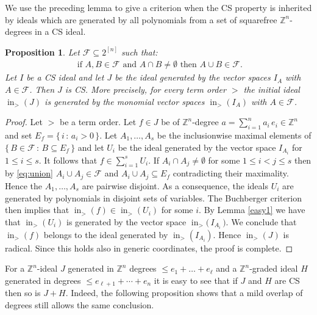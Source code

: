 \documentclass{amsart}
\newtheorem{proposition}[theorem]{Proposition}
\theoremstyle{definition}
\numberwithin{equation}{section}
\def\ini{\operatorname{in}}
\def\ZZ{\mathbb{Z}}
\begin{document}
We use the preceding lemma to give a criterion when the CS property is
inherited by ideals which are generated by all polynomials from a set of squarefree
$\ZZ^n$-degrees in a CS ideal.

\begin{proposition}
\label{easy2} Let $\mathcal{F}\subseteq 2^{[n]}$ such that:
\begin{align} \label{eq:union}
    \text{ if } A,B\in \mathcal{F}  \text{ and } A\cap B\neq \emptyset \text{ then } A\cup B\in \mathcal{F}. 
    \end{align}
    Let $I$ be a CS ideal and  let $J$ be the ideal generated by the vector spaces $I_A$ with $A\in \mathcal{F}$. Then $J$ is CS. More precisely, for every term order $>$ the initial ideal  
$\ini_{>}(J)$ is generated  by the monomial vector spaces $\ini_{>}(I_A)$ with $A\in \mathcal{F}$. 
\end{proposition}

\begin{proof} Let $>$ be a term order. Let $f\in J$ be of 
$\ZZ^n$-degree
$a = \sum_{i=1}^ n a_i\, e_i\in \ZZ^n$ and set $E_f=\{\, i\, :\, a_i>0\,\}$. Let $A_1,\dots,A_s$ be the inclusionwise maximal elements of $\{ \,B \in \mathcal F\,:\,B \subseteq E_f\,\}$ and let $U_i$ be the ideal generated by the vector space $I_{A_i}$ for $1 \leq i \leq s$. 
 It follows that $f\in \sum_{i=1}^s U_i$. If $A_i \cap A_j \neq \emptyset$ for some $1 \leq i < j \leq s$ then by \eqref{eq:union} $A_i \cup A_j \in \mathcal F$
 and $A_i \cup A_j \subseteq E_f$ contradicting their maximality. 
 Hence the $A_1,\ldots, A_s$ are pairwise disjoint. 
 As a consequence, the ideals $U_i$ are generated by polynomials in disjoint sets of variables. The Buchberger criterion then implies
 that $\ini_{>}(f)\in \ini_{>}(U_i)$ for some $i$. By Lemma \ref{easy1} we have that $\ini_{>}(U_i)$ is generated by the vector space $\ini_{>}\big(\,I_{A_i}\,\big)$. We conclude that $\ini_{>}(f)$ belongs to the ideal generated by $\ini_{>}(I_{A_i})$. Hence $\ini_{>}(J)$ is radical. Since this holds also in generic coordinates, 
 the proof is complete. 
\end{proof}   

For a $\ZZ^n$-ideal $J$ generated in $\ZZ^n$ degrees
$\leq e_1+\ldots +e_\ell$ and a $\ZZ^n$-graded  ideal 
$H$ generated in degrees
$\leq e_{\ell+1}+\cdots +e_n$ it is easy to see that 
if $J$ and $H$ are CS then so is $J+H$. 
Indeed, the following proposition shows that a mild overlap
of degrees still allows the same conclusion.
\end{document}
